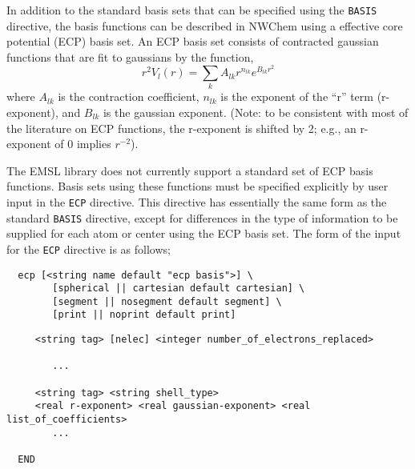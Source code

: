 \label{sec:ecp}

In addition to the standard basis sets that can be specified using the
\verb+BASIS+ directive, the basis functions can be described in NWChem
using a effective core potential (ECP) basis set.  An ECP basis set
consists of contracted gaussian functions that are fit to gaussians by the
function,
\[
r^2V_l(r) = \sum_{k} A_{lk} r^{n_{lk}} e^{B_{lk}r^{2}}
\]
where $A_{lk}$ is the contraction coefficient, $n_{lk}$ is the
exponent of the ``r'' term (r-exponent), and $B_{lk}$ is the gaussian
exponent.  (Note: to be consistent with most of the literature on ECP
functions, the r-exponent is shifted by 2; e.g., an r-exponent of 0 
implies $r^{-2}$).

The EMSL library does not currently support a standard set of ECP basis
functions.  Basis sets using these functions must be specified explicitly
by user input in the \verb+ECP+ directive.  This directive has
essentially the same form as the standard \verb+BASIS+ directive,
except for differences in the type of information to be supplied for
each atom or center using the ECP basis set.  The form of the input for
the \verb+ECP+ directive is as follows;

\begin{verbatim}
  ecp [<string name default "ecp basis">] \
        [spherical || cartesian default cartesian] \
        [segment || nosegment default segment] \
        [print || noprint default print]
\end{verbatim}

%
%
\begin{verbatim}
     <string tag> [nelec] <integer number_of_electrons_replaced>
 
        ...

     <string tag> <string shell_type>
     <real r-exponent> <real gaussian-exponent> <real list_of_coefficients>
        ...
     
  END
\end{verbatim}    


